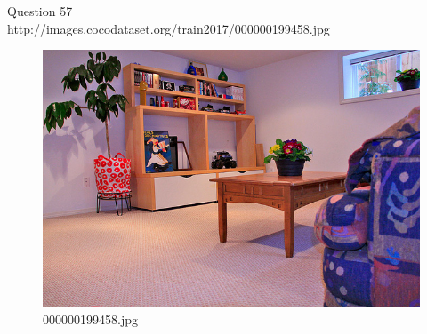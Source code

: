 Question 57\\
http://images.cocodataset.org/train2017/000000199458.jpg
\begin{figure}[h]
    \centering
    \includegraphics[width=0.8\linewidth]{../image set/hard/000000199458.jpg}
    \caption{000000199458.jpg}
\end{figure}
